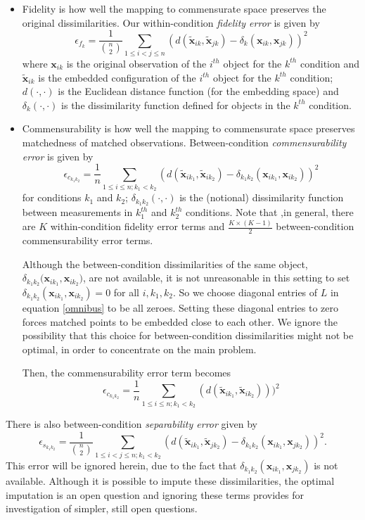 \documentclass[11pt]{article} %
\begin{document}
\begin{itemize}
\item Fidelity is how well the mapping to commensurate space preserves the original dissimilarities.
Our within-condition {\em fidelity error} is given by
    \[
\epsilon_{f_{k}} = \frac{1}{{{n}\choose{2}}} \sum_{1 \leq i < j \leq n} (d(\widetilde{\bm{x}}_{ik},\widetilde{\bm{x}}_{jk})-\delta_k(\bm{x}_{ik},\bm{x}_{jk}))^2
\] 
where ${\bm{x}}_{ik}$ is the original observation of the $i^{th}$ object for the $k^{th}$  condition and $\widetilde{\bm{x}}_{ik}$ is the embedded configuration of the $i^{th}$ object  for the $k^{th}$ condition;  $d(\cdot,\cdot)$ is the Euclidean distance function (for the embedding space) and $\delta_k(\cdot,\cdot)$ is the dissimilarity function defined for objects in the $k^{th}$ condition.

\item Commensurability is how well the mapping to commensurate space preserves matchedness of matched observations. Between-condition {\em commensurability error} is given by
    \[
\epsilon_{c_{k_1k_2}} = \frac{1}{n} \sum_{1 \leq i \leq n;k_1 <k_2} (d(\widetilde{\bm{x}}_{ik_1},\widetilde{\bm{x}}_{ik_2})-{ \delta_{k_1k_2}}(\bm{x}_{ik_1},\bm{x}_{ik_2}))^2
\label{comm-error}
\]
 for conditions $k_1$ and $k_2$; $\delta_{{k_1}{k_2}}(\cdot,\cdot)$ is the (notional) dissimilarity function between measurements in  $k_1^{th}$ and $k_2^{th}$ conditions. Note that ,in general, there are $K$  within-condition fidelity error terms and $\frac{K \times (K-1)}{2}$  between-condition commensurability error terms.

Although  the between-condition dissimilarities of the same object, ${ \delta_{k_1k_2}(\bm{x}_{ik_1},\bm{x}_{ik_2}})$, are not available,  it is not unreasonable in this setting  to set ${ \delta_{k_1k_2}}(\bm{x}_{ik_1},\bm{x}_{ik_2}) = 0$ for all $i,k_1,k_2$.  So we choose diagonal  entries of $L$ in  equation \eqref{omnibus} to be all zeroes. Setting these diagonal entries to zero forces matched points to be embedded close to each other. We ignore the possibility that this choice for between-condition dissimilarities might not be optimal, in order to concentrate on the main problem.

Then, the commensurability error  term becomes
  \[
\epsilon_{c_{k_1k_2}} = \frac{1}{n} \sum_{1 \leq i \leq n;k_1< k_2} (d(\widetilde{\bm{x}}_{ik_1},\widetilde{\bm{x}}_{ik_2})))^2
\]
\end{itemize}

 There is also between-condition {\em separability error} given by
    $$\epsilon_{s_{k_1k_2}} = \frac{1}{{{n}\choose{2}}} \sum_{1 \leq i < j \leq n;k_1 <k_2} (d(\widetilde{\bm{x}}_{ik_1},\widetilde{\bm{x}}_{jk_2})-{ \delta_{k_1k_2}}(\bm{x}_{ik_1},\bm{x}_{jk_2}))^2.$$ This error will be ignored herein, due to the fact that 
$\delta_{k_1k_2}(\bm{x}_{ik_1},\bm{x}_{jk_2})$ is not  available. Although it is possible to impute these dissimilarities, the optimal  imputation is an open question and ignoring these terms provides for investigation of simpler, still open questions.
\end{document}
